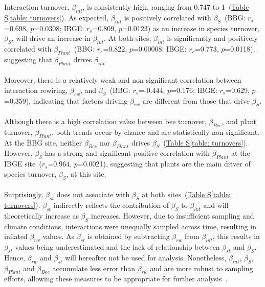 \documentclass[11pt]{article}
\begin{document}
Interaction turnover, $\beta_{int}$, is consistently high, ranging from 0.747 to 1~(\hyperref[table: turnovers]{Table S\ref{table: turnovers}}). As expected, $\beta_{int}$ is positively correlated with $\beta_{S}$~(BBG: $r_{s}$=0.698, $p$=0.0308; IBGE: $r_{s}$=0.809, $p$=0.0123) as an increase in species turnover, $\beta_{S}$, will drive an increase in $\beta_{int}$. At both sites, $\beta_{int}$ is significantly and positively correlated with $\beta_{Plant}$~(BBG: $r_{s}$=0.822, $p$=0.00008; IBGE: $r_{s}$=0.773, $p$=0.0118), suggesting that $\beta_{Plant}$ drives $\beta_{int}$.\\
\\
Moreover, there is a relatively weak and non-significant correlation between interaction rewiring, $\beta_{rw}$, and $\beta_{S}$~(BBG: $r_{s}$=-0.444, $p$=0.176; IBGE: $r_{s}$=0.629, $p$=0.359), indicating that factors driving $\beta_{rw}$ are different from those that drive $\beta_{S}$.\\
\\
Although there is a high correlation value between bee turnover, $\beta_{Bee}$, and plant turnover, $\beta_{Plant}$, both trends occur by chance and are statistically non-significant. At the BBG site, neither $\beta_{Bee}$ nor $\beta_{Plant}$ drives $\beta_{S}$~(\hyperref[table: turnovers]{Table S\ref{table: turnovers}}). However, $\beta_{S}$ has a strong and significant positive correlation with $\beta_{Plant}$ at the IBGE site~($r_{s}$=0.964, $p$=0.0021), suggesting that plants are the main driver of species turnover, $\beta_{S}$, at this site.\\
\\
Surprisingly, $\beta_{st}$ does not associate with $\beta_{S}$ at both sites~(\hyperref[table: turnovers]{Table S\ref{table: turnovers}}). $\beta_{st}$ indirectly reflects the contribution of $\beta_{S}$ to $\beta_{int}$ and will theoretically increase as $\beta_{S}$ increases. However, due to insufficient sampling and climate conditions, interactions were unequally sampled across time, resulting in inflated $\beta_{rw}$ values. As $\beta_{st}$ is obtained by subtracting $\beta_{rw}$ from $\beta_{int}$, this results in $\beta_{st}$ values being underestimated and the lack of relationship between $\beta_{st}$ and $\beta_{S}$. Hence, $\beta_{rw}$ and $\beta_{st}$ will hereafter not be used for analysis. Nonetheless, $\beta_{int}$, $\beta_{S}$, $\beta_{Plant}$ and $\beta_{Bee}$ accumulate less error than $\beta_{rw}$ and are more robust to sampling efforts, allowing these measures to be appropriate for further analysis~\citep{Poisot2012}.\\
\end{document}
